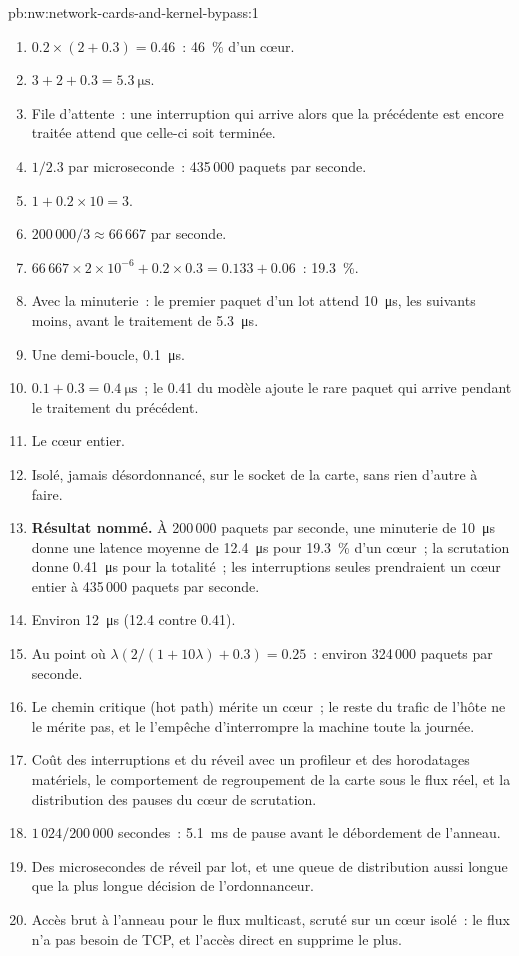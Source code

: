 \begin{solution}{pb:nw:network-cards-and-kernel-bypass:1}
\begin{enumerate}
\item $0.2 \times (2 + 0.3) = 0.46$~: 46~\% d'un cœur.
\item $3 + 2 + 0.3 = \qty{5.3}{\micro\second}$.
\item File d'attente~: une interruption qui arrive alors que la précédente est encore traitée attend que celle-ci soit terminée.
\item $1/2.3$ par microseconde~: 435\,000 paquets par seconde.
\item $1 + 0.2 \times 10 = 3$.
\item $200\,000 / 3 \approx 66\,667$ par seconde.
\item $66\,667 \times 2 \times 10^{-6} + 0.2 \times 0.3 = 0.133 + 0.06$~: 19.3~\%.
\item Avec la minuterie~: le premier paquet d'un lot attend \qty{10}{\micro\second}, les suivants moins, avant le traitement
  de \qty{5.3}{\micro\second}.
\item Une demi-boucle, \qty{0.1}{\micro\second}.
\item $0.1 + 0.3 = \qty{0.4}{\micro\second}$~; le 0.41 du modèle ajoute le rare paquet qui arrive pendant le traitement du précédent.
\item Le cœur entier.
\item Isolé, jamais désordonnancé, sur le socket de la carte, sans rien d'autre à faire.
\item \textbf{Résultat nommé.} À 200\,000 paquets par seconde, une minuterie de \qty{10}{\micro\second} donne une latence moyenne de \qty{12.4}{\micro\second}
  pour 19.3~\% d'un cœur~; la scrutation donne \qty{0.41}{\micro\second} pour la totalité~; les interruptions seules prendraient un cœur entier à 435\,000
  paquets par seconde.
\item Environ \qty{12}{\micro\second} (12.4 contre 0.41).
\item Au point où $\lambda(2/(1 + 10\lambda) + 0.3) = 0.25$~: environ 324\,000 paquets par seconde.
\item Le chemin critique (hot path) mérite un cœur~; le reste du trafic de l'hôte ne le mérite pas, et le  l'empêche d'interrompre la machine toute la journée.
\item Coût des interruptions et du réveil avec un profileur et des horodatages matériels, le comportement de regroupement de la carte sous le flux réel, et la
  distribution des pauses du cœur de scrutation.
\item $1\,024 / 200\,000$ secondes~: \qty{5.1}{\milli\second} de pause avant le débordement de l'anneau.
\item Des microsecondes de réveil par lot, et une queue de distribution aussi longue que la plus longue décision de l'ordonnanceur.
\item Accès brut à l'anneau pour le flux multicast, scruté sur un cœur isolé~: le flux n'a pas besoin de TCP, et l'accès direct en supprime le plus.
\end{enumerate}
\end{solution}

